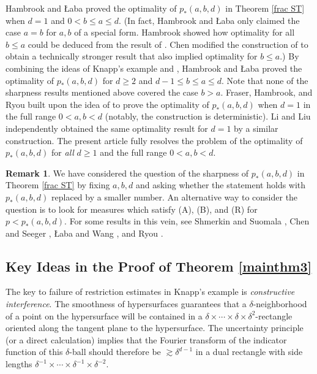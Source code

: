 \documentclass{amsart}
\numberwithin{equation}{section}
\theoremstyle{definition}
\newtheorem{remark}[theorem]{Remark}
\theoremstyle{definition}
\begin{document}
 Hambrook and {\L}aba \cite{HL2013}  proved the optimality of $p_*(a, b, d)$ in Theorem \ref{frac ST} when $d=1$ and $0 < b \leq a \leq d$. 
 (In fact, Hambrook and {\L}aba \cite{HL2013} only claimed the case $a=b$ for $a,b$ of a special form.   
Hambrook \cite{hambrook-thesis} 
showed how optimality for all $b \leq a$ could be deduced from the result of \cite{HL2013}.  
Chen \cite{chen} modified the construction of 
\cite{HL2013} to obtain a technically stronger result that also implied optimality for $b \leq a$.) 
By combining 
the ideas of Knapp's example and \cite{HL2013}, 
Hambrook and {\L}aba \cite{HL2016} proved the optimality of $p_*(a,b,d)$ for $d \geq 2$ and $d-1 \leq b \leq a \leq d$.  
Note that  none of the sharpness results mentioned above covered the case $b>a$. Fraser, Hambrook, and Ryou 
\cite{fraser-hambrook-ryou} 
built upon the idea  of  \cite{HL2013} to
prove the optimality of $p_*(a,b,d)$ when $d=1$ in the full range $0 < a,b < d$ (notably, the construction is  deterministic). 
Li and Liu \cite{bochen-dimension} independently obtained the same optimality result for $d=1$ by a similar construction. 
The present article 
fully resolves 
the problem of the optimality of $p_*(a,b,d)$ for \textit{all} $d \geq 1$ and the full range $0 < a,b < d$. 



\begin{remark}
We have considered the question of the sharpness of $p_*(a,b,d)$ in Theorem \ref{frac ST} by fixing $a,b,d$ and asking  whether the statement holds with $p_*(a,b,d)$ replaced by a smaller number. An alternative way to consider the question  is to look for measures which satisfy (A), (B), and (R) for $p < p_{*}(a,b,d)$.  For some results in this vein, see Shmerkin and Suomala \cite{shmerkin-suomala}, Chen and Seeger \cite{chen-seeger}, {\L}aba and Wang \cite{laba-wang}, and Ryou \cite{Ryou-2023}. 
\end{remark}


\subsection{Key Ideas in the Proof of Theorem \ref{mainthm3}}\label{ideas}

The key to failure of restriction estimates in Knapp's example is \textit{constructive interference}. 
The smoothness of hypersurfaces guarantees that a $\delta$-neighborhood of a point on the hypersurface will be contained in a $\delta \times \cdots \times \delta \times \delta^2$-rectangle oriented along the tangent plane to the hypersurface. 
The uncertainty principle (or a direct calculation) implies that 
the Fourier transform of the indicator function of this $\delta$-ball should therefore be $\gtrsim \delta^{d-1}$ in a dual rectangle with side lengths $\delta^{-1} \times \cdots \times \delta^{-1} \times \delta^{-2}$. 
\end{document}

